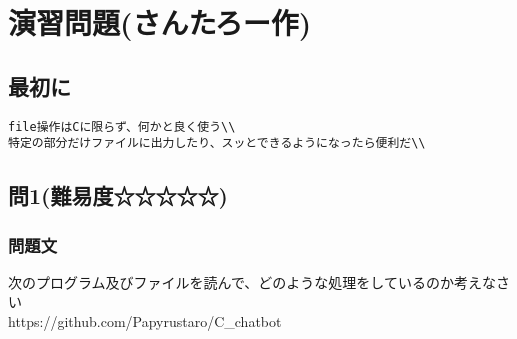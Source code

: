 \section{演習問題(さんたろー作)}
\subsection{最初に}
\begin{verbatim}
file操作はCに限らず、何かと良く使う\\
特定の部分だけファイルに出力したり、スッとできるようになったら便利だ\\

\end{verbatim}
\subsection{問1(難易度☆☆☆☆☆)}
\subsubsection{問題文}
次のプログラム及びファイルを読んで、どのような処理をしているのか考えなさい\\

https://github.com/Papyrustaro/C_chatbot
